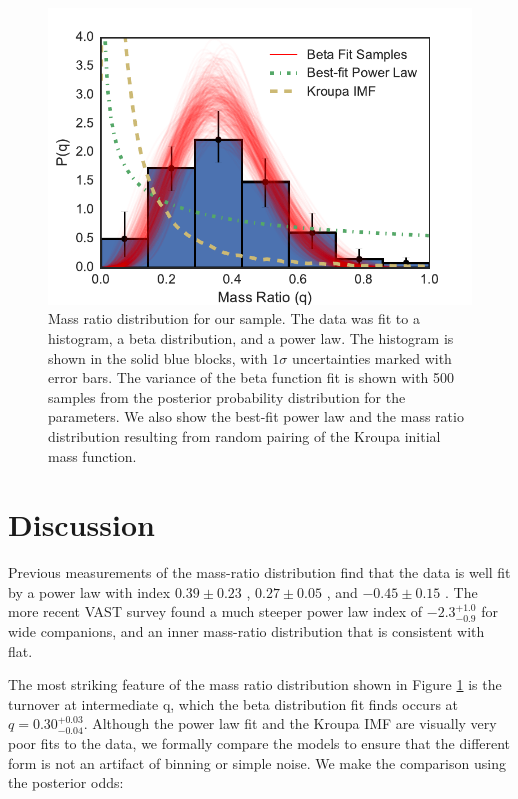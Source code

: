 \documentclass{emulateapj}
\begin{document}
\begin{figure}
\includegraphics[width=\columnwidth]{MRD_total.pdf}
\caption{Mass ratio distribution for our sample. The data was fit to a histogram, a beta distribution, and a power law. The histogram is shown in the solid blue blocks, with $1 \sigma$ uncertainties marked with error bars. The variance of the beta function fit is shown with 500 samples from the posterior probability distribution for the parameters. We also show the best-fit power law and the mass ratio distribution resulting from random pairing of the Kroupa initial mass function.}
\label{fig:mrd}
\end{figure}




\section{Discussion}
\label{sec:discussion}

Previous measurements of the mass-ratio distribution find that the data is well fit by a power law with index $0.39 \pm 0.23$ \citep[M dwarf stars][]{Delfosse2004}, $0.27 \pm 0.05$ \citep[Solar type stars][]{Duchene2013}, and $-0.45 \pm 0.15$ \citep[intermediate-mass stars][]{Kouwenhoven2007}. The more recent VAST survey found a much steeper power law index of $-2.3^{+1.0}_{-0.9}$ for wide companions, and an inner mass-ratio distribution that is consistent with flat.

The most striking feature of the mass ratio distribution shown in Figure \ref{fig:mrd} is the turnover at intermediate q, which the beta distribution fit finds occurs at $q = 0.30^{+0.03}_{-0.04}$. Although the power law fit and the Kroupa IMF are visually very poor fits to the data, we formally compare the models to ensure that the different form is not an artifact of binning or simple noise. We make the comparison using the posterior odds:
\end{document}

